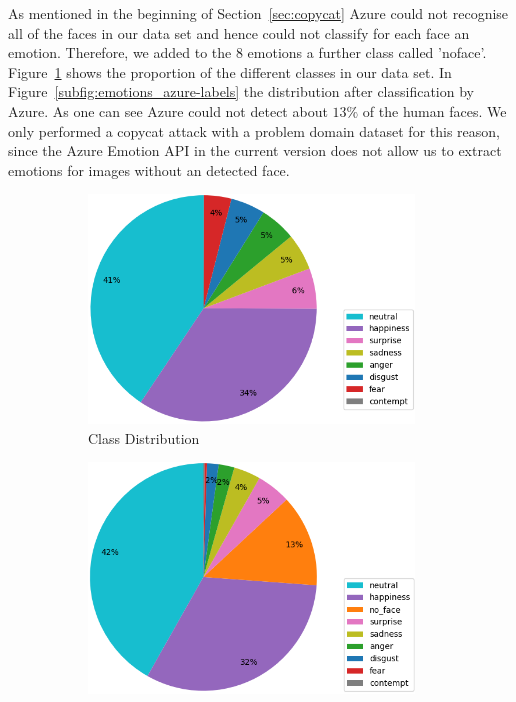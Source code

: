 \documentclass[a4paper,11pt]{article}
\begin{document}
       As mentioned in the beginning of Section~\ref{sec:copycat} Azure could not recognise all of the faces in our data set and hence could not classify for each face an emotion. Therefore, we added to the 8 emotions a further class called 'no\textunderscore face'. Figure~\ref{subfig:emotions_original-labels} shows the proportion of the different classes in our data set. In Figure~\ref{subfig:emotions_azure-labels} the distribution after classification by Azure. As one can see Azure could not detect about $13\%$ of the human faces. We only performed a copycat attack with a problem domain dataset for this reason, since the Azure Emotion API in the current version does not allow us to extract emotions for images without an detected face.
       
       \begin{figure}[h!]
            \centering
            \begin{subfigure}[c]{0.45\textwidth}
                \centering
                \includegraphics[width=0.95\textwidth]{exercise_3/paper/images/emotions_original-labels.png}
                \caption{Class Distribution}
                \label{subfig:emotions_original-labels}
            \end{subfigure}
            \begin{subfigure}[c]{0.45\textwidth}
                \centering
                \includegraphics[width=0.95\textwidth]{exercise_3/paper/images/emotions_azure-labels.png}

\end{subfigure}
\end{figure}
\end{document}
